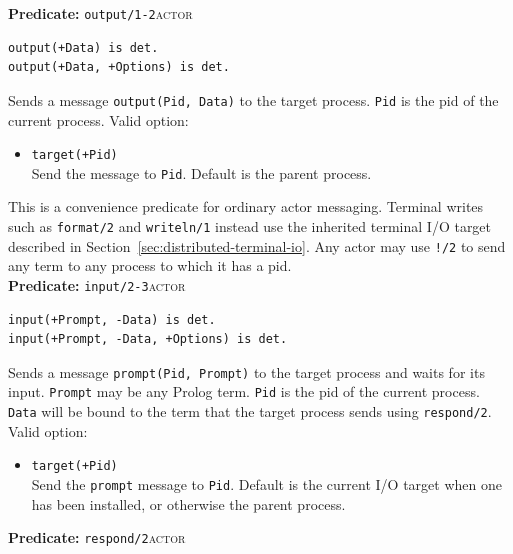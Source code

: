 \noindent \textbf{Predicate:} \texttt{output/\allowbreak{}1-2}\hfill\textsc{actor}

\begin{verbatim}
output(+Data) is det.
output(+Data, +Options) is det.
\end{verbatim}

\noindent Sends a message \texttt{output(\allowbreak{}Pid,\allowbreak{}\,\allowbreak{}Data)} to the target process.
\texttt{Pid} is the pid of the current process. Valid option:

\begin{itemize}
\item
  \texttt{target(\allowbreak{}+Pid)}\\
  Send the message to \texttt{Pid}. Default is the parent process.
\end{itemize}

\noindent This is a convenience predicate for ordinary actor messaging.
Terminal writes such as \texttt{format/\allowbreak{}2} and \texttt{writeln/\allowbreak{}1} instead
use the inherited terminal I/O target described in
Section~\ref{sec:distributed-terminal-io}. Any actor may use \texttt{!/\allowbreak{}2}
to send any term to any process to which it has a pid.\\


\noindent \textbf{Predicate:} \texttt{input/\allowbreak{}2-3}\hfill\textsc{actor}

\begin{verbatim}
input(+Prompt, -Data) is det.
input(+Prompt, -Data, +Options) is det.
\end{verbatim}

\noindent Sends a message \texttt{prompt(\allowbreak{}Pid,\allowbreak{}\,\allowbreak{}Prompt)} to the target process and
waits for its input. \texttt{Prompt} may be any Prolog term.
\texttt{Pid} is the pid of the current process. \texttt{Data} will be bound to
the term that the target process sends using \texttt{respond/\allowbreak{}2}. Valid option:

\begin{itemize}
\item
  \texttt{target(\allowbreak{}+Pid)}\\
  Send the \texttt{prompt} message to \texttt{Pid}. Default is the current I/O
  target when one has been installed, or otherwise the parent process.
\end{itemize}


\noindent \textbf{Predicate:} \texttt{respond/\allowbreak{}2}\hfill\textsc{actor}

